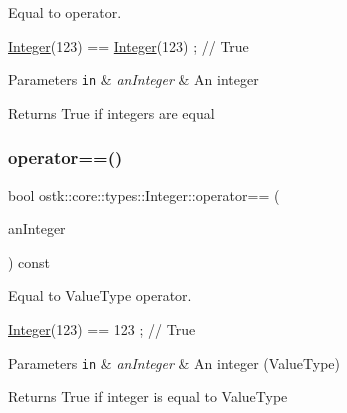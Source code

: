 Equal to operator. 


\begin{DoxyCode}
\hyperlink{classostk_1_1core_1_1types_1_1_integer_a209b939281106d4b590ad98fae291af9}{Integer}(123) == \hyperlink{classostk_1_1core_1_1types_1_1_integer_a209b939281106d4b590ad98fae291af9}{Integer}(123) ; \textcolor{comment}{// True}
\end{DoxyCode}



\begin{DoxyParams}[1]{Parameters}
\mbox{\tt in}  & {\em an\+Integer} & An integer \\
\hline
\end{DoxyParams}
\begin{DoxyReturn}{Returns}
True if integers are equal 
\end{DoxyReturn}
\mbox{\label{classostk_1_1core_1_1types_1_1_integer_af19a5d010994626e9ee62cbdabf8fda6}} 
\subsubsection{\texorpdfstring{operator==()}{operator==()}\hspace{0.1cm}{\footnotesize\ttfamily [2/2]}}
{\footnotesize\ttfamily bool ostk\+::core\+::types\+::\+Integer\+::operator== (\begin{DoxyParamCaption}\item[{const \hyperlink{classostk_1_1core_1_1types_1_1_integer_a76a5f41f78659f116eafaf26cecc3244}{Integer\+::\+Value\+Type} \&}]{an\+Integer }\end{DoxyParamCaption}) const}



Equal to Value\+Type operator. 


\begin{DoxyCode}
\hyperlink{classostk_1_1core_1_1types_1_1_integer_a209b939281106d4b590ad98fae291af9}{Integer}(123) == 123 ; \textcolor{comment}{// True}
\end{DoxyCode}



\begin{DoxyParams}[1]{Parameters}
\mbox{\tt in}  & {\em an\+Integer} & An integer (Value\+Type) \\
\hline
\end{DoxyParams}
\begin{DoxyReturn}{Returns}
True if integer is equal to Value\+Type 
\end{DoxyReturn}
\mbox{\label{classostk_1_1core_1_1types_1_1_integer_a5aa0ea22279bc6c347f7a9eea9770f89}} 
